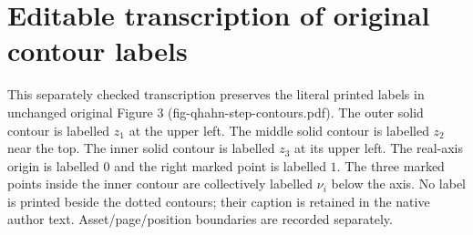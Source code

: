 \section*{Editable transcription of original contour labels}
\noindent This separately checked transcription preserves the literal printed labels in unchanged original Figure 3 (fig-qhahn-step-contours.pdf). The outer solid contour is labelled $z_1$ at the upper left. The middle solid contour is labelled $z_2$ near the top. The inner solid contour is labelled $z_3$ at its upper left. The real-axis origin is labelled $0$ and the right marked point is labelled $1$. The three marked points inside the inner contour are collectively labelled $\nu_i$ below the axis. No label is printed beside the dotted contours; their caption is retained in the native author text. Asset/page/position boundaries are recorded separately.

